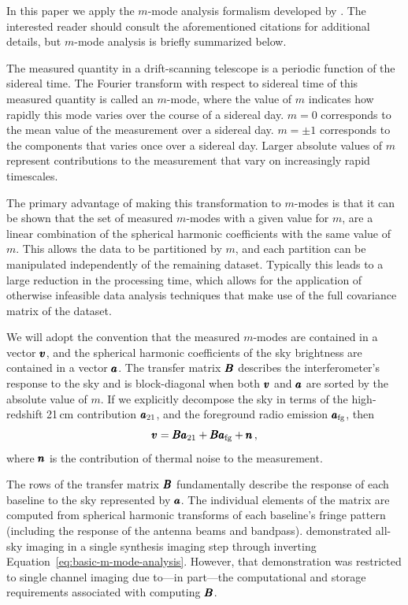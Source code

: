 \begin{bibunit}
In this paper we apply the $m$-mode analysis formalism developed by \citet{2014ApJ...781...57S,
2015PhRvD..91h3514S}. The interested reader should consult the aforementioned citations for
additional details, but $m$-mode analysis is briefly summarized below.

The measured quantity in a drift-scanning telescope is a periodic function of the sidereal time.
The Fourier transform with respect to sidereal time of this measured quantity is called an $m$-mode,
where the value of $m$ indicates how rapidly this mode varies over the course of a sidereal day.
$m=0$ corresponds to the mean value of the measurement over a sidereal day. $m=\pm1$ corresponds to
the components that varies once over a sidereal day. Larger absolute values of $m$ represent
contributions to the measurement that vary on increasingly rapid timescales.

The primary advantage of making this transformation to $m$-modes is that it can be shown that the
set of measured $m$-modes with a given value for $m$, are a linear combination of the spherical
harmonic coefficients with the same value of $m$. This allows the data to be partitioned by $m$, and
each partition can be manipulated independently of the remaining dataset. Typically this leads to a
large reduction in the processing time, which allows for the application of otherwise infeasible
data analysis techniques that make use of the full covariance matrix of the dataset.

We will adopt the convention that the measured $m$-modes are contained in a vector $\pmb v$, and the
spherical harmonic coefficients of the sky brightness are contained in a vector $\pmb a$. The transfer
matrix $\pmb B$ describes the interferometer's response to the sky and is block-diagonal when both $\pmb
v$ and $\pmb a$ are sorted by the absolute value of $m$. If we explicitly decompose the sky in terms
of the high-redshift 21\,cm contribution $\pmb a_\text{21}$, and the foreground radio emission $\pmb
a_\text{fg}$, then
\begin{equation}\label{eq:basic-m-mode-analysis}
    \pmb v = \pmb B \pmb a_\text{21} + \pmb B \pmb a_\text{fg} + \pmb n \,,
\end{equation}
where $\pmb n$ is the contribution of thermal noise to the measurement.

The rows of the transfer matrix $\pmb B$ fundamentally describe the response of each baseline to the
sky represented by $\pmb a$. The individual elements of the matrix are computed from spherical
harmonic transforms of each baseline's fringe pattern (including the response of the antenna beams
and bandpass). \citet{2018AJ....156...32E} demonstrated all-sky imaging in a single synthesis
imaging step through inverting Equation~\ref{eq:basic-m-mode-analysis}. However, that demonstration
was restricted to single channel imaging due to---in part---the computational and storage
requirements associated with computing $\pmb B$.


\end{bibunit}
